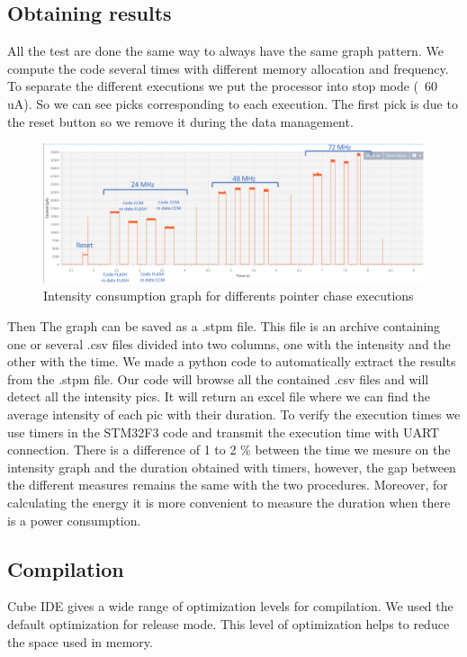 \documentclass[conference]{IEEEtran}
\begin{document}
\subsection{Obtaining results}
All the test are done the same way to always have the same graph pattern. We
compute the code several times with different memory allocation and frequency.
To separate the different executions we put the processor into stop mode (~60
uA). So we can see picks corresponding to each execution. The first pick is due
to the reset button so we remove it during the data management.
\begin{center}

    \begin{figure}[htb]
        \centering
        \includegraphics[scale=0.80]{images/pointer_chase_capture_mod.png}
        \caption{Intensity consumption graph for differents pointer chase executions}
        \label{fig:graph_intensity}
    \end{figure}
\end{center}
Then  The graph can be saved as a .stpm file. This file is an archive containing
one or several .csv files divided into two columns, one with the intensity and
the other with the time. We made a python code to automatically extract the
results from the .stpm file. Our code will browse all the contained .csv files
and will detect all the intensity pics. It will return an excel file where we
can find the average intensity of each pic with their duration. To verify the
execution times we use timers in the STM32F3 code and transmit the execution
time with UART connection. There is a difference of 1 to 2 \% between the time
we mesure on the intensity graph and the duration obtained with timers, however,
the gap between the different measures remains the same with the two procedures.
Moreover, for calculating the energy it is more convenient to measure the
duration when there is a power consumption. 

\subsection{Compilation}
Cube IDE gives a wide range of optimization levels for compilation. We used the
default optimization for release mode. This level of optimization helps to
reduce the space used in memory.
\end{document}
